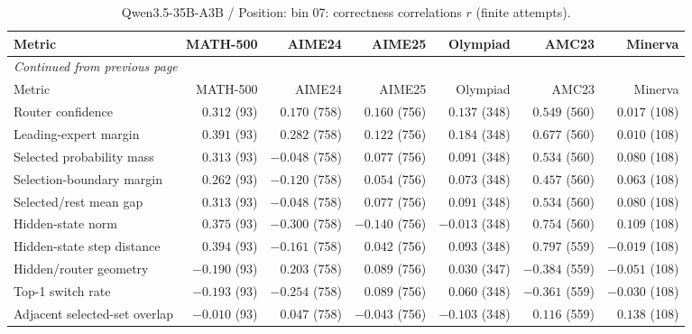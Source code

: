 \begingroup\scriptsize\setlength{\tabcolsep}{4pt}
\begin{longtable}{@{}lrrrrrr@{}}
\caption{Qwen3.5-35B-A3B / Position: bin 07: correctness correlations $r$ (finite attempts).}\label{tab:multi-qwen-position-bin_07}\\
\toprule
Metric & MATH-500 & AIME24 & AIME25 & Olympiad & AMC23 & Minerva \\
\midrule\endfirsthead
\multicolumn{7}{l}{\textit{Continued from previous page}}\\
\toprule
Metric & MATH-500 & AIME24 & AIME25 & Olympiad & AMC23 & Minerva \\
\midrule\endhead
\bottomrule\endfoot
Router confidence & $0.312$ (93) & $0.170$ (758) & $0.160$ (756) & $0.137$ (348) & $0.549$ (560) & $0.017$ (108) \\
Leading-expert margin & $0.391$ (93) & $0.282$ (758) & $0.122$ (756) & $0.184$ (348) & $0.677$ (560) & $0.010$ (108) \\
Selected probability mass & $0.313$ (93) & $-0.048$ (758) & $0.077$ (756) & $0.091$ (348) & $0.534$ (560) & $0.080$ (108) \\
Selection-boundary margin & $0.262$ (93) & $-0.120$ (758) & $0.054$ (756) & $0.073$ (348) & $0.457$ (560) & $0.063$ (108) \\
Selected/rest mean gap & $0.313$ (93) & $-0.048$ (758) & $0.077$ (756) & $0.091$ (348) & $0.534$ (560) & $0.080$ (108) \\
Hidden-state norm & $0.375$ (93) & $-0.300$ (758) & $-0.140$ (756) & $-0.013$ (348) & $0.754$ (560) & $0.109$ (108) \\
Hidden-state step distance & $0.394$ (93) & $-0.161$ (758) & $0.042$ (756) & $0.093$ (348) & $0.797$ (559) & $-0.019$ (108) \\
Hidden/router geometry & $-0.190$ (93) & $0.203$ (758) & $0.089$ (756) & $0.030$ (347) & $-0.384$ (559) & $-0.051$ (108) \\
Top-1 switch rate & $-0.193$ (93) & $-0.254$ (758) & $0.089$ (756) & $0.060$ (348) & $-0.361$ (559) & $-0.030$ (108) \\
Adjacent selected-set overlap & $-0.010$ (93) & $0.047$ (758) & $-0.043$ (756) & $-0.103$ (348) & $0.116$ (559) & $0.138$ (108) \\
\end{longtable}\endgroup

